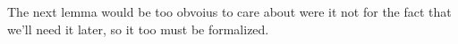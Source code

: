 \begin{code}
\AgdaSymbol{)}\<%
\\
%
\>[2]\AgdaSpace{}%
\AgdaSymbol{=}\AgdaSpace{}%
\AgdaSpace{}%
\AgdaOperator{\AgdaInductiveConstructor{,}}\AgdaSpace{}%
\AgdaSymbol{(}\AgdaSpace{}%
\AgdaOperator{\AgdaInductiveConstructor{,}}\AgdaSpace{}%
\AgdaSymbol{)}\AgdaSpace{}%
\AgdaOperator{\AgdaInductiveConstructor{,}}\AgdaSpace{}%
\AgdaSpace{}%
\AgdaOperator{\AgdaInductiveConstructor{,}}\AgdaSpace{}%
\AgdaSymbol{(}\AgdaSpace{}%
\AgdaSpace{}%
\AgdaSpace{}%
\AgdaSpace{}%
\AgdaSpace{}%
\AgdaSymbol{)}\<%
\\
\>[0]\<%
\end{code}

The next lemma would be too obvoius to care about were it not for the
fact that we'll need it later, so it too must be formalized.

